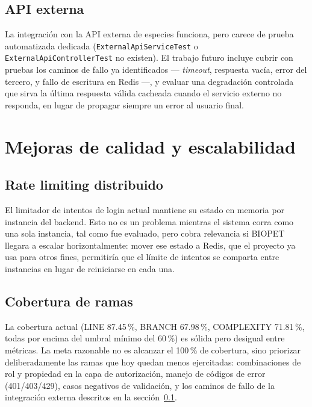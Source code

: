 \subsection{API externa}
\label{sec:futuro-api-externa}

La integraci\'on con la API externa de especies funciona, pero carece de
prueba automatizada dedicada (\texttt{ExternalApiServiceTest} o
\texttt{ExternalApiControllerTest} no existen). El trabajo futuro incluye
cubrir con pruebas los caminos de fallo ya identificados --- \emph{timeout},
respuesta vac\'ia, error del tercero, y fallo de escritura en Redis ---, y
evaluar una degradaci\'on controlada que sirva la \'ultima respuesta v\'alida
cacheada cuando el servicio externo no responda, en lugar de propagar
siempre un error al usuario final.

\section{Mejoras de calidad y escalabilidad}
\label{sec:futuro-calidad-escalabilidad}

\subsection{Rate limiting distribuido}
\label{sec:futuro-rate-limiting}

El limitador de intentos de login actual mantiene su estado en memoria por
instancia del backend. Esto no es un problema mientras el sistema corra como
una sola instancia, tal como fue evaluado, pero cobra relevancia si BIOPET
llegara a escalar horizontalmente: mover ese estado a Redis, que el proyecto
ya usa para otros fines, permitir\'ia que el l\'imite de intentos se
comparta entre instancias en lugar de reiniciarse en cada una.

\subsection{Cobertura de ramas}
\label{sec:futuro-cobertura-ramas}

La cobertura actual (LINE 87.45\,\%, BRANCH 67.98\,\%, COMPLEXITY 71.81\,\%,
todas por encima del umbral m\'inimo del 60\,\%) es s\'olida pero desigual
entre m\'etricas. La meta razonable no es alcanzar el 100\,\% de cobertura,
sino priorizar deliberadamente las ramas que hoy quedan menos ejercitadas:
combinaciones de rol y propiedad en la capa de autorizaci\'on, manejo de
c\'odigos de error (401/403/429), casos negativos de validaci\'on, y los
caminos de fallo de la integraci\'on externa descritos en la
secci\'on~\ref{sec:futuro-api-externa}.

